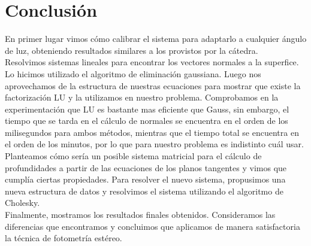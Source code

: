 \section{Conclusión}

En primer lugar vimos cómo calibrar el sistema para adaptarlo a cualquier ángulo de luz, obteniendo resultados similares a los provistos por la cátedra. \\

Resolvimos sistemas lineales para encontrar los vectores normales a la superfice. Lo hicimos utilizado el algoritmo de eliminación gaussiana. Luego nos aprovechamos de la estructura de nuestras ecuaciones para mostrar que existe la factorización LU y la utilizamos en nuestro problema. Comprobamos en la experimentación que LU es bastante mas eficiente que Gauss, sin embargo, el tiempo que se tarda en el cálculo de normales se encuentra en el orden de los milisegundos para ambos métodos, mientras que el tiempo total se encuentra en el orden de los minutos, por lo que para nuestro problema es indistinto cuál usar. \\

Planteamos cómo sería un posible sistema matricial para el cálculo de profundidades a partir de las ecuaciones de los planos tangentes y vimos que cumplía ciertas propiedades. Para resolver el nuevo sistema, propusimos una nueva estructura de datos y resolvimos el sistema utilizando el algoritmo de Cholesky. \\

Finalmente, mostramos los resultados finales obtenidos. Consideramos las diferencias que encontramos y concluimos que aplicamos de manera satisfactoria la técnica de fotometría estéreo. \\